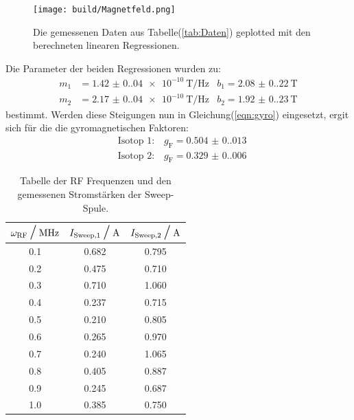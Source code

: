 		\begin{figure}[H]
			\centering
			\texttt{[image: build/Magnetfeld.png]}
			\caption{Die gemessenen Daten aus Tabelle(\ref{tab:Daten}) geplotted mit den berechneten linearen Regressionen.}
			\label{fig:Daten} 
		\end{figure}

		\noindent
		Die Parameter der beiden Regressionen wurden zu:
		\begin{align*}
			m_1 &= \SI{1.42(0.04)e-10}{\tesla\per\hertz}  &b_1= \SI{2.08(0.22)}{\tesla}\\
			m_2 &= \SI{2.17(0.04)e-10}{\tesla\per\hertz}  &b_2= \SI{1.92(0.23)}{\tesla}
		\end{align*}
		bestimmt. Werden diese Steigungen nun in Gleichung(\ref{eqn:gyro}) eingesetzt, ergit sich für die die gyromagnetischen Faktoren:
		\begin{align*}
			&\text{Isotop 1:} \quad g_\text{F} = \num{0.504(0.013)}\\		
			&\text{Isotop 2:} \quad g_\text{F} = \num{0.329(0.006)}			
		\end{align*}

		\begin{table}[h]
			\begin{center}
				\begin{tabular}{c c c  }%
					\toprule
						{$\omega_\text{RF} \mathbin{\scalebox{1.5} / } \si{\mega\hertz}$} & {$I_\text{Sweep,1}  \mathbin{\scalebox{1.5} / } \si{\ampere}$} & 
          				{$I_\text{Sweep,2} \mathbin{\scalebox{1.5} / } \si{\ampere}$}\\
					\midrule
 					0.1	& 0.682 & 0.795\\
					0.2 & 0.475 & 0.710\\
					0.3 & 0.710 & 1.060\\
					0.4 & 0.237 & 0.715\\
					0.5 & 0.210 & 0.805\\
					0.6 & 0.265 & 0.970\\
					0.7 & 0.240 & 1.065\\
					0.8 & 0.405 & 0.887\\ 
					0.9 & 0.245 & 0.687\\
					1.0 & 0.385 & 0.750\\
					\bottomrule
				\end{tabular}				
				\caption{Tabelle der RF Frequenzen und den gemessenen Stromstärken der Sweep-Spule.}
			\end{center}
			\label{tab:dat1}
		\end{table}

